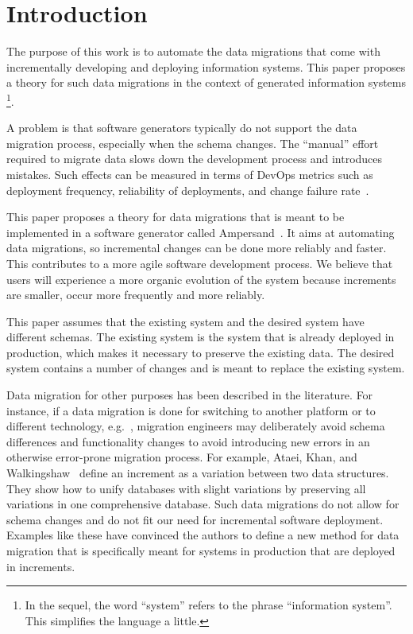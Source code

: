 \documentclass[runningheads]{llncs}
\begin{document}
\section{Introduction}
\label{sct:Introduction}
   The purpose of this work is to automate the data migrations that come with incrementally developing and deploying information systems.
   This paper proposes a theory for such data migrations in the context of generated information systems%
\footnote{In the sequel, the word ``system'' refers to the phrase ``information system''. This simplifies the language a little. }.

   A problem is that software generators typically do not support the data migration process, especially when the schema changes.
   The ``manual'' effort required to migrate data slows down the development process and introduces mistakes.
   Such effects can be measured in terms of DevOps metrics such as deployment frequency, reliability of deployments, and change failure rate~\cite{DevOps2021}.

   This paper proposes a theory for data migrations that is meant to be implemented in a software generator called Ampersand~\cite{JoostenRAMiCS2017,Joosten-JLAMP2018}.
   It aims at automating data migrations, so incremental changes can be done more reliably and faster.
   This contributes to a more agile software development process.
   We believe that users will experience a more organic evolution of the system because increments are smaller, occur more frequently and more reliably.
   
   This paper assumes that the existing system and the desired system have different schemas.
   The existing system is the system that is already deployed in production,
   which makes it necessary to preserve the existing data.
   The desired system contains a number of changes and is meant to replace the existing system.

   Data migration for other purposes has been described in the literature.
   For instance, if a data migration is done for switching to another platform or to different technology,
   e.g.~\cite{Gholami2016,Bisbal1999},
   migration engineers may deliberately avoid schema differences and functionality changes to avoid introducing new errors in an otherwise error-prone migration process.
   For example, Ataei, Khan, and Walkingshaw~\cite{Ataei2021,Walkingshaw2014} define an increment as a variation between two data structures.
   They show how to unify databases with slight variations by preserving all variations in one comprehensive database.
   Such data migrations do not allow for schema changes and do not fit our need for incremental software deployment.
   Examples like these have convinced the authors to define a new method for data migration that is specifically meant for systems in production that are
   deployed in increments.
   
\end{document}
